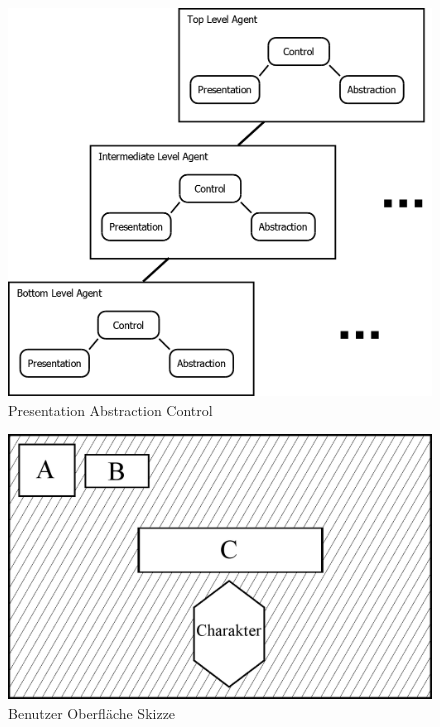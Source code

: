 \begin{figure}[H]
\centering
\caption{Presentation Abstraction Control}
\label{Abb:PAC}
\includegraphics[scale=0.275]{Bilder/Diagramme/PAC.png}
\end{figure}

\begin{figure}[H]
\centering
\caption{Benutzer Oberfläche Skizze}
\label{Abb:UISkizze}
\includegraphics[scale=0.285]{Bilder/Diagramme/UserInterface.png}
\end{figure}

